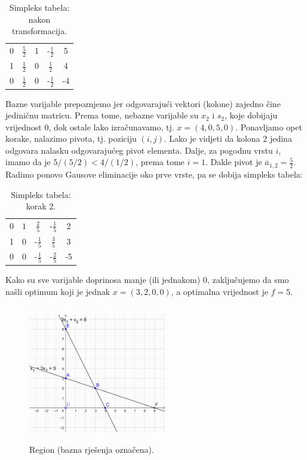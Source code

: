 \documentclass[a4paper, utf8, 11pt, colorlinks]{book}
\begin{document}
  \begin{table}[!ht]
     \centering
     \begin{tabular}{c c c c | c}
         0 &  $\frac{5}{2}$  & 1 & -$\frac{1}{2} $& 5 \\
         1 &  $\frac{1}{2}$ & 0 & $\frac{1}{2}$ & 4 \\ \hline
         0 &  $\frac{1}{2}$ & 0 & -$\frac{1}{2}$ & -4 \\ \hline
     \end{tabular}
     \caption{Simpleks tabela: nakon transformacija.}
     \label{tab:simpleks_tabela2}
 \end{table}
Bazne varijable prepoznjemo jer odgovarajući vektori (kolone) zajedno čine jediničnu matricu. Prema tome, 
 nebazne varijable su $x_2$ i $s_2$, koje dobijaju vrijednost 0, dok ostale lako izračunavamo, tj. $ x = (4, 0, 5, 0)$. Ponavljamo opet korake, nalazimo pivota, tj. poziciju  $(i,j)$. Lako je vidjeti da kolona 2 jedina odgovara nalasku odgovarajućeg pivot elementa. Dalje, za pogodnu vrstu $i$, imamo da je $5 / (5/2) < 4 / (1/2)$, prema tome $i =1$. Dakle pivot je 
 $\overline{a}_{1,2} = \frac{5}{2}$. Radimo ponovo Gausove eliminacije oko prve vrste, pa se dobija simpleks tabela:
 
   \begin{table}[!ht]
     \centering
     \begin{tabular}{c c c c | c}
         0 &  $1$  & $\frac{2}{5}$             &  -$\frac{1}{5} $ & 2 \\
         1 &  0    &      -$\frac{1}{5}$    & $\frac{3}{5}$    & 3 \\ \hline
         0 &  0    &   -$\frac{1}{5}$       &   -$\frac{2}{5}$   & -5 \\ \hline
     \end{tabular}
     \caption{Simpleks tabela: korak 2.}
     \label{tab:simpleks_tabela3}
 \end{table}
 Kako su sve varijable doprinosa manje (ili jednakom) 0, zaključujemo da smo našli optimum koji je jednak $x = (3, 2, 0, 0)$, a optimalna vrijednost je $f = 5$.
 
 \begin{figure}[!ht]
     \centering
     \includegraphics[width=170pt, height=170pt]{simpleks-region-2.eps}
     \caption{Region (bazna rješenja označena).}
     \label{fig:simplex_region} 
 \end{figure}
 
\end{document}

